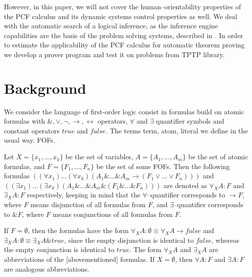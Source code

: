 \documentclass[runningheads,a4paper]{llncs}
\begin{document}
However, in this paper, we will not cover the human--orientability properties of the PCF calculus and its dynamic systems control properties as well. We deal with the automatic search of a logical inference, as the inference engine capabilities are the basis of the problem solving systems, described in \cite{ICDS2000}. In order to estimate the applicability of the PCF calculus for automatic theorem proving we develop a prover program and test it on problems from TPTP library.



\section{Background}
We consider the language of first-order logic consist in formulas build on atomic formulas with $\&, \vee, \neg, \rightarrow, \leftrightarrow$ operators, $\forall$ and $\exists$ quantifier symbols and constant operators $true$ and $false$. The terms term, atom, literal we define in the usual way. FOFs.

Let $X = \{x_1,\ldots,x_k\}$ be the set of variables, $A = \{A_1,\ldots,A_m\}$ be the set of atomic formulas, and $F = \{F_1,\ldots,F_n\}$ be the set of some FOFs. Then the following formulas $((\forall x_1) \ldots (\forall x_k) (A_1 \& \ldots \& A_m \rightarrow (F_1 \vee \ldots \vee F_n)))$ and $((\exists x_1) \ldots (\exists x_k) (A_1 \& \ldots \& A_m \& (F_1 \& \ldots \& F_n)))$ are denoted as  $\forall_XA\colon F$ and $\exists_XA\colon F$ respectively, keeping in mind that the $\forall$--quantifier corresponds to $\rightarrow F$, where $F$ means disjunction of all formulas from $F$, and $\exists$--quantifier corresponds to $\& F$, where $F$ means conjunctions of all formulas from $F$.

If $F = \emptyset$, then the formulas have the form $\forall_XA\colon\emptyset \equiv \forall_XA \rightarrow false$ and $\exists_XA\colon\emptyset \equiv \exists_XA \& true$, since the empty disjunction is identical to $false$, whereas the empty conjunction is identical to $true$. The form $\forall_XA$ and $\exists_XA$ are abbreviations of the [abovementioned] formulas. If $X = \emptyset$, then $\forall A\colon F$ and $\exists A\colon F$ are analogous abbreviations.
\end{document}

